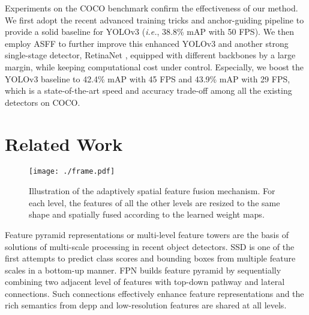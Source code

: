 \documentclass[10pt,twocolumn,letterpaper]{article}
\begin{document}
Experiments on the COCO \cite{ms-coco} benchmark confirm the effectiveness of our method. We first adopt the recent advanced training tricks \cite{bag} and anchor-guiding pipeline \cite{guide} to provide a solid baseline for YOLOv3 \cite{yolov3} (\emph{i.e.}, 38.8\% mAP with 50 FPS). We then employ ASFF to further improve this enhanced YOLOv3 and another strong single-stage detector, RetinaNet \cite{focal-loss}, equipped with different backbones by a large margin, while keeping computational cost under control. Especially, we boost the YOLOv3 baseline to 42.4\% mAP with 45 FPS and 43.9\% mAP with 29 FPS, which is a state-of-the-art speed and accuracy trade-off among all the existing detectors on COCO.

\section{Related Work}

\begin{figure*}[thbp]
	\begin{center}
		\texttt{[image: ./frame.pdf]}
	\end{center}
	\caption{Illustration of the adaptively spatial feature fusion mechanism. For each level, the features of all the other levels are resized to the same shape and spatially fused according to the learned weight maps.}
	\label{fig:frame}
\end{figure*}

Feature pyramid representations or multi-level feature towers are the basis of solutions of multi-scale processing in recent object detectors. SSD \cite{ssd} is one of the first attempts to predict class scores and bounding boxes from multiple feature scales in a bottom-up manner. FPN \cite{FPN} builds feature pyramid by sequentially combining two adjacent level of features with top-down pathway and lateral connections. Such connections effectively enhance feature representations and the rich semantics from depp and low-resolution features are shared at all levels.
\end{document}
